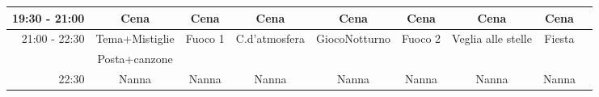\documentclass[a4paper]{article}
\begin{document}
\begin{landscape}
\begin{adjustwidth}{-2.5cm}{-1cm}
\begin{tabular}{|r|c|c|c|c|c|c|c|c|}
        19:30 - 21:00&Cena&Cena&Cena&Cena&Cena&Cena&Cena&\\ \hline      
        \multirow{2}{*}{21:00 - 22:30}&Tema+Mistiglie&Fuoco 1&C.d'atmosfera&GiocoNotturno&Fuoco 2&Veglia alle stelle&Fiesta&\\&Posta+canzone& & & & & & & \\\hline        

        22:30&Nanna&Nanna&Nanna&Nanna&Nanna&Nanna&Nanna&\\ \hline
        \end{tabular}  
        \end{adjustwidth}
\end{landscape}

\newpage
    
\newpage
    
\newpage
    
\newpage
    
\newpage
    
\newpage
    
%    
%    
%    
\end{document}

